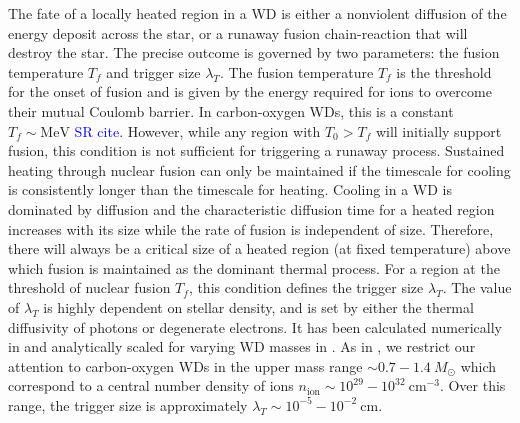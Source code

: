 \documentclass[twocolumn,showpacs,preprintnumbers,amsmath,amssymb,prd]{revtex4}
\newcommand{\MeV}{\text{MeV}}
\newcommand{\cm}{\text{cm}}
\begin{document}
The fate of a locally heated region in a WD is either a nonviolent diffusion of the energy deposit across the star, or a runaway fusion chain-reaction that will destroy the star.
The precise outcome is governed by two parameters: the fusion temperature $T_f$ and trigger size $\lambda_T$.
The fusion temperature $T_f$ is the threshold for the onset of fusion and is given by the energy required for ions to overcome their mutual Coulomb barrier.
In carbon-oxygen WDs, this is a constant $T_f \sim \MeV$ \textcolor{blue}{SR cite}.
However, while any region with $T_0 > T_f$ will initially support fusion, this condition is not sufficient for triggering a runaway process.
Sustained heating through nuclear fusion can only be maintained if the timescale for cooling is consistently longer than the timescale for heating. 
Cooling in a WD is dominated by diffusion and the characteristic diffusion time for a heated region increases with its size while the rate of fusion is independent of size. 
Therefore, there will always be a critical size of a heated region (at fixed temperature) above which fusion is maintained as the dominant thermal process.
For a region at the threshold of nuclear fusion $T_f$, this condition defines the trigger size $\lambda_T$.
The value of $\lambda_T$ is highly dependent on stellar density, and is set by either the thermal diffusivity of photons or degenerate electrons.
It has been calculated numerically in \cite{Woosley} and analytically scaled for varying WD masses in \cite{Graham:2015apa}.
As in \cite{Graham:2015apa}, we restrict our attention to carbon-oxygen WDs in the upper mass range $\sim 0.7 - 1.4 ~M_{\odot}$ which correspond to a central number density of ions $n_\text{ion} \sim 10^{29} - 10^{32} ~\cm^{-3}$.
Over this range, the trigger size is approximately $\lambda_T \sim 10^{-5} - 10^{-2} ~\text{cm}$.
\end{document}
